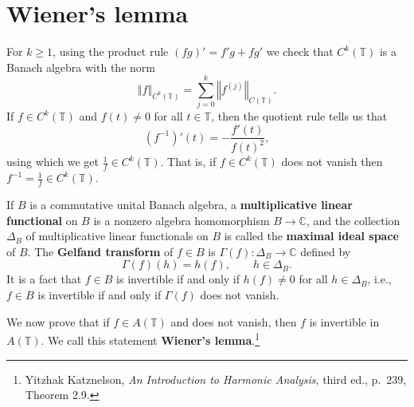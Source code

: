 \documentclass{article}
\newcommand{\norm}[1]{\left\Vert #1 \right\Vert}
\theoremstyle{definition}
\theoremstyle{definition}
\begin{document}
\section{Wiener's lemma}
For $k \geq 1$, 
using the product rule $(fg)'=f'g+fg'$ we check that $C^k(\mathbb{T})$ is a Banach algebra with the norm
\[
\norm{f}_{C^k(\mathbb{T})} = \sum_{j=0}^k \norm{f^{(j)}}_{C(\mathbb{T})}.
\]
If $f \in C^k(\mathbb{T})$ and $f(t) \neq 0$ for all $t \in \mathbb{T}$, then the quotient rule tells us that
\[
\left(f^{-1} \right)'(t)  = -\frac{f'(t)}{f(t)^2},
\]
using which we get $\frac{1}{f} \in C^k(\mathbb{T})$. That is, if $f \in C^k(\mathbb{T})$ does not vanish then
$f^{-1}=\frac{1}{f} \in C^k(\mathbb{T})$.

If $B$ is a commutative unital Banach algebra, a \textbf{multiplicative linear functional} on
$B$ is a nonzero algebra homomorphism $B \to \mathbb{C}$, and the collection $\Delta_B$
of multiplicative
linear functionals on $B$ is called the \textbf{maximal ideal space} of $B$. 
The \textbf{Gelfand transform}  of $f \in B$ is $\Gamma(f):\Delta_B \to \mathbb{C}$ defined by
\[
\Gamma(f)(h) = h(f), \qquad h \in \Delta_B.
\] 
It is a fact that $f \in B$ is invertible if and only if $h(f) \neq 0$ for all $h \in \Delta_B$, i.e.,
$f \in B$ is invertible if and only if $\Gamma(f)$ does not vanish.

We now prove that if $f \in A(\mathbb{T})$ and does not vanish, then $f$ is invertible in $A(\mathbb{T})$. We call this statement \textbf{Wiener's
lemma}.\footnote{Yitzhak Katznelson, {\em An Introduction to Harmonic Analysis}, third ed., p.~239, Theorem 2.9.}
\end{document}
